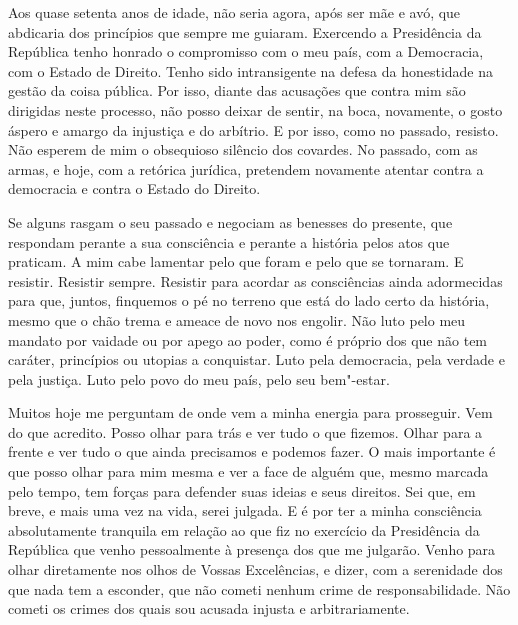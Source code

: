 Aos quase setenta anos de idade, não seria agora, após ser mãe e avó,
que abdicaria dos princípios que sempre me guiaram. Exercendo a
Presidência da República tenho honrado o compromisso com o meu país, com
a Democracia, com o Estado de Direito. Tenho sido intransigente na
defesa da honestidade na gestão da coisa pública. Por isso, diante das
acusações que contra mim são dirigidas neste processo, não posso deixar
de sentir, na boca, novamente, o gosto áspero e amargo da injustiça e do
arbítrio. E por isso, como no passado, resisto. Não esperem de mim o
obsequioso silêncio dos covardes. No passado, com as armas, e hoje, com
a retórica jurídica, pretendem novamente atentar contra a democracia e
contra o Estado do Direito.

Se alguns rasgam o seu passado e negociam as
benesses do presente, que respondam perante a sua consciência e perante
a história pelos atos que praticam. A mim cabe lamentar pelo que foram e
pelo que se tornaram. E resistir. Resistir sempre. Resistir para acordar
as consciências ainda adormecidas para que, juntos, finquemos o pé no
terreno que está do lado certo da história, mesmo que o chão trema e
ameace de novo nos engolir. Não luto pelo meu mandato por vaidade ou por
apego ao poder, como é próprio dos que não tem caráter, princípios ou
utopias a conquistar. Luto pela democracia, pela verdade e pela justiça.
Luto pelo povo do meu país, pelo seu bem"-estar.

Muitos hoje me perguntam
de onde vem a minha energia para prosseguir. Vem do que acredito. Posso
olhar para trás e ver tudo o que fizemos. Olhar para a frente e ver tudo
o que ainda precisamos e podemos fazer. O mais importante é que posso
olhar para mim mesma e ver a face de alguém que, mesmo marcada pelo
tempo, tem forças para defender suas ideias e seus direitos. Sei que, em
breve, e mais uma vez na vida, serei julgada. E é por ter a minha
consciência absolutamente tranquila em relação ao que fiz no exercício
da Presidência da República que venho pessoalmente à presença dos que me
julgarão. Venho para olhar diretamente nos olhos de Vossas Excelências,
e dizer, com a serenidade dos que nada tem a esconder, que não cometi
nenhum crime de responsabilidade. Não cometi os crimes dos quais sou
acusada injusta e arbitrariamente.

